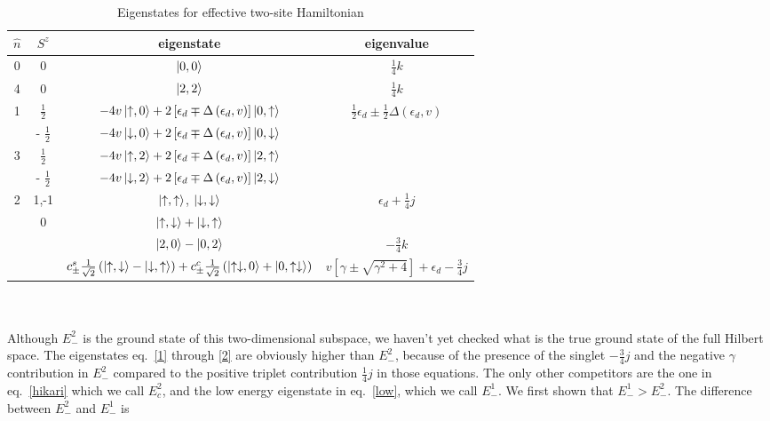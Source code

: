 \documentclass[twoside,11pt]{report}
\numberwithin{equation}{section}
\begin{document}
\begin{table}[htpb!]
	\centering
	\begin{tabular}{|c|c|c|c|}
		\hline
		\(\hat n\) & \(S^z\) & eigenstate & eigenvalue\\
		\hline
		0 & 0 & \(\ket{0,0}\) & \(\frac{1}{4}k\)\\
		4 & 0 & \(\ket{2,2}\) & \(\frac{1}{4}k\)\\
		\multirow{2}{*}{1} & \(\frac{1}{2}\) & \(-4v\ket{\uparrow,0} +2 \left[ \epsilon_d \mp \Delta\left(\epsilon_d , v\right)\right] \ket{0, \uparrow}\) & \multirow{4}{*}{\(\frac{1}{2} \epsilon_d \pm \frac{1}{2}\Delta\left(\epsilon_d , v\right)\)}\\
		 & - \(\frac{1}{2}\) & \(-4v\ket{\downarrow,0} +2 \left[ \epsilon_d \mp \Delta\left(\epsilon_d , v\right)\right] \ket{0, \downarrow}\)  &\\
		\multirow{2}{*}{3} & \(\frac{1}{2}\) & \(-4v\ket{\uparrow,2} +2 \left[ \epsilon_d \mp \Delta\left(\epsilon_d , v\right)\right] \ket{2, \uparrow}\) &\\
		 & - \(\frac{1}{2}\) & \(-4v\ket{\downarrow,2} +2 \left[ \epsilon_d \mp \Delta\left(\epsilon_d , v\right)\right] \ket{2, \downarrow}\)  &\\
		\multirow{5}{*}{2} & 1,-1 & \(\ket{\uparrow,\uparrow}\), \(\ket{\downarrow,\downarrow}\) & \multirow{2}{*}{\(\epsilon_d + \frac{1}{4}j\)}\\
		& \multirow{3}{*}{0} & \(\ket{\uparrow,\downarrow} + \ket{\downarrow, \uparrow}\) & \\
		& & \(\ket{2,0} - \ket{0,2}\) & \(-\frac{3}{4}k\)\\
		& & \(c_\pm^s \frac{1}{\sqrt 2}\left(\ket{\uparrow, \downarrow} - \ket{\downarrow, \uparrow}\right) + c^c_\pm \frac{1}{\sqrt 2}\left(\ket{\uparrow\downarrow, 0} + \ket{0, \uparrow\downarrow}\right)\) & \(v\left[ \gamma \pm \sqrt{\gamma^2 + 4} \right] + \epsilon_d - \frac{3}{4}j\)\\
		\hline
	\end{tabular}
	\caption{Eigenstates for effective two-site Hamiltonian}
	\label{tab:label}
\end{table}
\\\\Although \(E^2_-\) is the ground state of this two-dimensional subspace, we haven't yet checked what is the true ground state of the full Hilbert space. The eigenstates eq.~\ref{1} through \ref{2} are obviously higher than \(E_-^2\), because of the presence of the singlet \(- \frac{3}{4}j\) and the negative \(\gamma\) contribution in \(E_-^2\) compared to the positive triplet contribution \( \frac{1}{4}j\) in those equations. The only other competitors are the one in eq.~\ref{hikari} which we call \(E_c^2\), and the low energy eigenstate in eq.~\ref{low}, which we call \(E_-^1\). We first shown that \(E_-^1 > E_-^2\). The difference between \(E_-^2\) and \(E_-^1\) is
\end{document}
